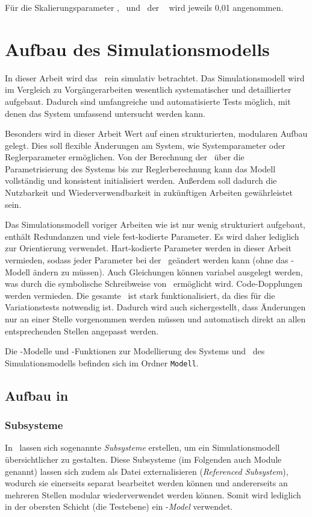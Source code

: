 Für die Skalierungsparameter \xopth, \pheth\ und \phzth\ der \crb\  wird jeweils 0,01 angenommen.



\section{Aufbau des Simulationsmodells}

In dieser Arbeit wird das \dpds\ rein simulativ betrachtet.
Das Simulationsmodell wird im Vergleich zu Vorgängerarbeiten wesentlich systematischer und detaillierter aufgebaut.
Dadurch sind umfangreiche und automatisierte Tests möglich, mit denen das System umfassend untersucht werden kann.

Besonders wird in dieser Arbeit Wert auf einen strukturierten, modularen Aufbau gelegt.
Dies soll flexible Änderungen am System, wie \zB Systemparameter oder Reglerparameter ermöglichen.
Von der Berechnung der \bwgl\ über die Parametrisierung des Systems bis zur Reglerberechnung kann das Modell vollständig und konsistent initialisiert werden.
Außerdem soll dadurch die Nutzbarkeit und Wiederverwendbarkeit in zukünftigen Arbeiten gewährleistet sein.

Das Simulationsmodell voriger Arbeiten wie \cite{chang} ist nur wenig strukturiert aufgebaut, enthält Redundanzen und viele fest-kodierte Parameter.
Es wird daher lediglich zur Orientierung verwendet.
Hart-kodierte Parameter werden in dieser Arbeit vermieden, sodass jeder Parameter bei der \init\ geändert werden kann (ohne das \sm-Modell ändern zu müssen).
Auch Gleichungen können variabel ausgelegt werden, was durch die symbolische Schreibweise von \ml\ ermöglicht wird.
Code-Dopplungen werden vermieden. 
Die gesamte \init\ ist stark funktionalisiert, da dies für die Variationstests notwendig ist.
Dadurch wird auch sichergestellt, dass Änderungen nur an einer Stelle vorgenommen werden müssen und automatisch direkt an allen entsprechenden Stellen angepasst werden.

Die \sm-Modelle und \ml-Funktionen zur Modellierung des Systems und \init\ des Simulationsmodells befinden sich im Ordner \texttt{Modell}. 


\subsection{Aufbau in \Simulink}

\subsubsection{Subsysteme}
In \sm\ lassen sich sogenannte \emph{Subsysteme} erstellen, um ein Simulationsmodell übersichtlicher zu gestalten.
Diese Subsysteme (im Folgenden auch Module genannt) lassen sich zudem als Datei externalisieren (\emph{Referenced Subsystem}), wodurch sie einerseits separat bearbeitet werden können und andererseits an mehreren Stellen modular wiederverwendet werden können.
Somit wird lediglich in der obersten Schicht (die Testebene) ein \sm-\emph{Model} verwendet.

